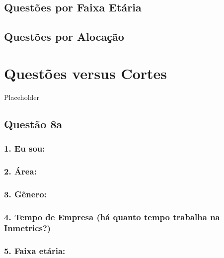 \documentclass[]{book}
\begin{document}
\hypertarget{questoes-por-faixa-etaria}{%
\section{Questões por Faixa Etária}\label{questoes-por-faixa-etaria}}

\hypertarget{questoes-por-alocacao}{%
\section{Questões por Alocação}\label{questoes-por-alocacao}}

\hypertarget{questoes-versus-cortes}{%
\chapter{Questões versus Cortes}\label{questoes-versus-cortes}}

Placeholder

\hypertarget{questao-8a}{%
\section{Questão 8a}\label{questao-8a}}

\hypertarget{eu-sou}{%
\subsection{1. Eu sou:}\label{eu-sou}}

\hypertarget{area}{%
\subsection{2. Área:}\label{area}}

\hypertarget{genero}{%
\subsection{3. Gênero:}\label{genero}}

\hypertarget{tempo-de-empresa-ha-quanto-tempo-trabalha-na-inmetrics}{%
\subsection{4. Tempo de Empresa (há quanto tempo trabalha na Inmetrics?)}\label{tempo-de-empresa-ha-quanto-tempo-trabalha-na-inmetrics}}

\hypertarget{faixa-etaria}{%
\subsection{5. Faixa etária:}\label{faixa-etaria}}
\end{document}
